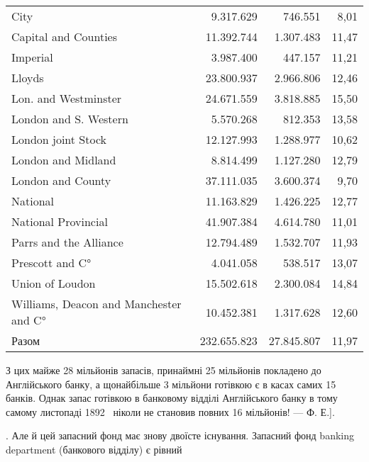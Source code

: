 {\begin{tabularx}{\textwidth}{l r r r}
City \dotfill{}                                    & 9.317.629  & 746.551  & 8,01 \\
Capital and Counties \dotfill{}                   & 11.392.744 & 1.307.483 & 11,47 \\
Imperial \dotfill{}                               & 3.987.400  & 447.157  & 11,21 \\
Lloyds \dotfill{}                                 & 23.800.937 & 2.966.806 & 12,46 \\
Lon. and Westminster \dotfill{}                   & 24.671.559 & 3.818.885 & 15,50 \\
London and S. Western \dotfill{}                  & 5.570.268  & 812.353  & 13,58 \\
London joint Stock \dotfill{}                     & 12.127.993 & 1.288.977 & 10,62 \\
London and Midland \dotfill{}                     & 8.814.499  & 1.127.280 & 12,79 \\
London and County \dotfill{}                      & 37.111.035 & 3.600.374 & 9,70 \\
National \dotfill{}                               & 11.163.829 & 1.426.225 & 12,77 \\
National Provincial \dotfill{}                     & 41.907.384 & 4.614.780 & 11,01 \\
Parrs and the Alliance \dotfill{}                 & 12.794.489 & 1.532.707 & 11,93 \\
Prescott and C° \dotfill{}                        & 4.041.058  & 538.517  & 13,07 \\
Union of Loudon \dotfill{}                       & 15.502.618 & 2.300.084 & 14,84 \\
Williams, Deacon and Manchester and C°\dotfill{} & 10.452.381 & 1.317.628 & 12,60 \\
\cmidrule(lr){1-4}
Разом                                  & 232.655.823 & 27.845.807 & 11,97

  \end{tabularx}

З цих майже 28 мільйонів запасів, принаймні 25 мільйонів покладено до Англійського банку, а
щонайбільше 3 мільйони готівкою є в касах самих 15 банків. Однак запас готівкою в банковому відділі
Англійського банку в тому самому листопаді 1892~ ніколи не становив повних 16 мільйонів! — Ф. Е.].

}. Але й цей запасний фонд має знову двоїсте
існування. Запасний фонд banking department (банкового відділу) є рівний
